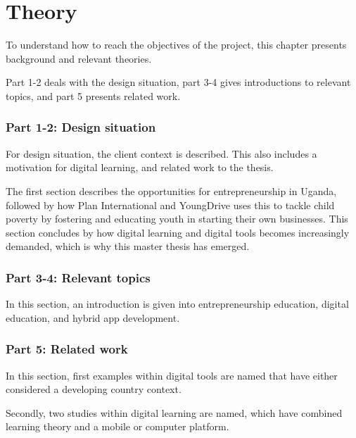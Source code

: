 %

\section{Theory}

To understand how to reach the objectives of the project, this chapter presents background and relevant theories.

Part 1-2 deals with the design situation, part 3-4 gives introductions to relevant topics, and part 5 presents related work.

\subsubsection{Part 1-2: Design situation}
For design situation, the client context is described. This also includes a motivation for digital learning, and related work to the thesis.

The first section describes the opportunities for entrepreneurship in Uganda, followed by how Plan International and YoungDrive uses this to tackle child poverty by fostering and educating youth in starting their own businesses. This section concludes by how digital learning and digital tools becomes increasingly demanded, which is why this master thesis has emerged.

\subsubsection{Part 3-4: Relevant topics}
In this section, an introduction is given into entrepreneurship education, digital education, and hybrid app development.

\subsubsection{Part 5: Related work}
In this section, first examples within digital tools are named that have either considered a developing country context.

Secondly, two studies within digital learning are named, which have combined learning theory and a mobile or computer platform.






